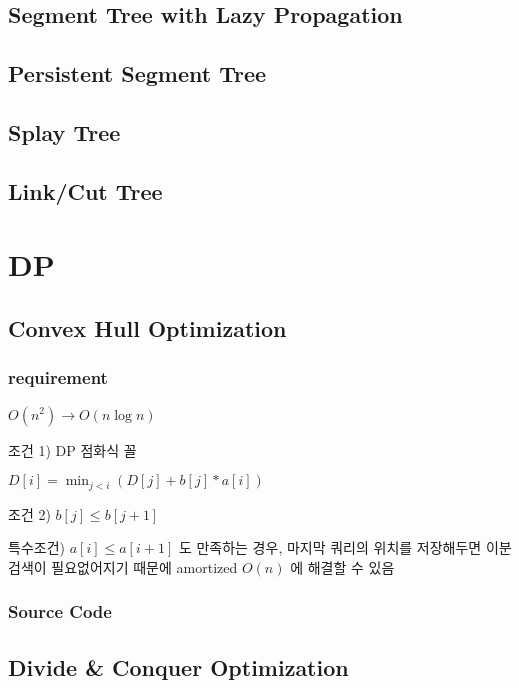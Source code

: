 \documentclass[10pt,landscape,a4paper,twocolumn]{article}
\begin{document}
\subsection{Segment Tree with Lazy Propagation}


\subsection{Persistent Segment Tree}


\subsection{Splay Tree}


\subsection{Link/Cut Tree}


\section{DP}

\subsection{Convex Hull Optimization}
\subsubsection{requirement}
$O(n^{2}) \to O(n\log{n})$

조건 1) DP 점화식 꼴

$D[i] = \min_{j<i}( D[j] + b[j] * a[i] )$

조건 2) $b[j] \leq b[j+1]$

특수조건) $a[i] \leq a[i+1]$ 도 만족하는 경우, 마지막 쿼리의 위치를 저장해두면 이분검색이 필요없어지기 때문에 amortized $O(n)$ 에 해결할 수 있음
\subsubsection{Source Code}


\subsection{Divide \& Conquer Optimization}
\end{document}
